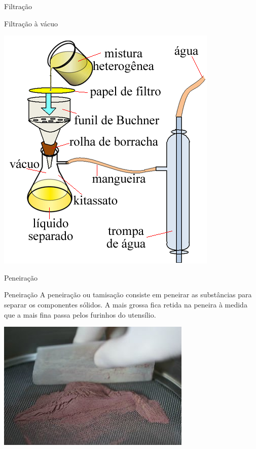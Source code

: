 \documentclass{beamer}
\begin{document}
\begin{frame}[label={sec:org6152427}]{Filtração}
\begin{block}{Filtração à vácuo}
\begin{center}
\includegraphics[scale=0.4]{../img/filtracao-a-vacuo.jpg}
\end{center}
\end{block}
\end{frame}
\begin{frame}[label={sec:org31c4963}]{Peneiração}
\begin{block}{Peneiração}
A peneiração ou tamisação consiste em peneirar as substâncias para separar os componentes sólidos. A mais grossa fica retida na peneira à medida que a mais fina passa pelos furinhos do utensílio.

\begin{center}
\includegraphics[scale=0.4]{../img/peneiracao.jpg}
\end{center}
\end{block}
\end{frame}
\end{document}
